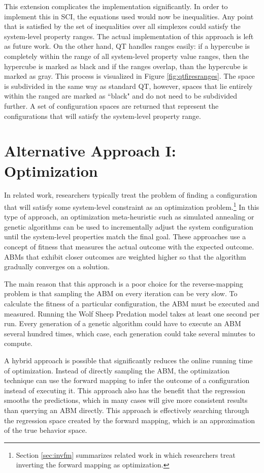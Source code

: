 This extension complicates the implementation significantly.
In order to implement this in SCI, the equations used would now be inequalities.
Any point that is satisfied by the set of inequalities over all simplexes could satisfy the system-level property ranges.
The actual implementation of this approach is left as future work.
On the other hand, QT handles ranges easily: if a hypercube is completely within the range of all system-level property value ranges, then the hypercube is marked as black and if the ranges overlap, than the hypercube is marked as gray.
This process is visualized in Figure \ref{fig:qtfiresranges}.
The space is subdivided in the same way as standard QT, however, spaces that lie entirely within the ranged are marked as ``black" and do not need to be subdivided further.
A set of configuration spaces are returned that represent the configurations that will satisfy the system-level property range.

\section{Alternative Approach I: Optimization}
In related work, researchers typically treat the problem of finding a configuration that will satisfy some system-level constraint as an optimization problem.\footnote{Section \ref{sec:invfm} summarizes related work in which researchers treat inverting the forward mapping as optimization.}
In this type of approach, an optimization meta-heuristic such as simulated annealing or genetic algorithms can be used to incrementally adjust the system configuration until the system-level properties match the final goal.
These approaches use a concept of fitness that measures the actual outcome with the expected outcome.
ABMs that exhibit closer outcomes are weighted higher so that the algorithm gradually converges on a solution.

The main reason that this approach is a poor choice for the reverse-mapping problem is that sampling the ABM on every iteration can be very slow.
To calculate the fitness of a particular configuration, the ABM must be executed and measured.
Running the Wolf Sheep Predation model takes at least one second per run.
Every generation of a genetic algorithm could have to execute an ABM several hundred times, which case, each generation could take several minutes to compute.

A hybrid approach is possible that significantly reduces the online running time of optimization.
Instead of directly sampling the ABM, the optimization technique can use the forward mapping to infer the outcome of a configuration instead of executing it.
This approach also has the benefit that the regression smooths the predictions, which in many cases will give more consistent results than querying an ABM directly.
This approach is effectively searching through the regression space created by the forward mapping, which is an approximation of the true behavior space.

